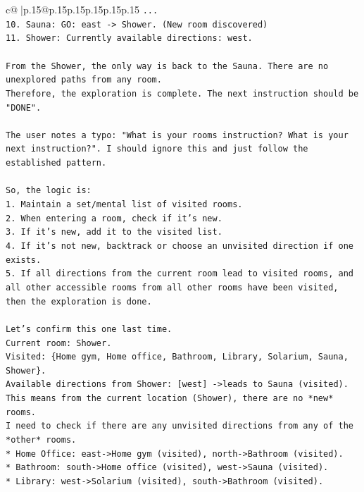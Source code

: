 \documentclass{article}
\begin{document}
{\begin{supertabular}{c@{$\;$}|p{.15\linewidth}@{}p{.15\linewidth}p{.15\linewidth}p{.15\linewidth}p{.15\linewidth}p{.15\linewidth}}
{{{\texttt{...} \\
\texttt{10. Sauna: GO: east {-}> Shower. (New room discovered)} \\
\texttt{11. Shower: Currently available directions: west.} \\
\\ 
\texttt{From the Shower, the only way is back to the Sauna. There are no unexplored paths from any room.} \\
\texttt{Therefore, the exploration is complete. The next instruction should be "DONE".} \\
\\ 
\texttt{The user notes a typo: "What is your rooms instruction? What is your next instruction?". I should ignore this and just follow the established pattern.} \\
\\ 
\texttt{So, the logic is:} \\
\texttt{1. Maintain a set/mental list of visited rooms.} \\
\texttt{2. When entering a room, check if it's new.} \\
\texttt{3. If it's new, add it to the visited list.} \\
\texttt{4. If it's not new, backtrack or choose an unvisited direction if one exists.} \\
\texttt{5. If all directions from the current room lead to visited rooms, and all other accessible rooms from all other rooms have been visited, then the exploration is done.} \\
\\ 
\texttt{Let's confirm this one last time.} \\
\texttt{Current room: Shower.} \\
\texttt{Visited: \{Home gym, Home office, Bathroom, Library, Solarium, Sauna, Shower\}.} \\
\texttt{Available directions from Shower: {[}west{]} {-}>leads to Sauna (visited).} \\
\texttt{This means from the current location (Shower), there are no *new* rooms.} \\
\texttt{I need to check if there are any unvisited directions from any of the *other* rooms.} \\
\texttt{*   Home Office: east{-}>Home gym (visited), north{-}>Bathroom (visited).} \\
\texttt{*   Bathroom: south{-}>Home office (visited), west{-}>Sauna (visited).} \\
\texttt{*   Library: west{-}>Solarium (visited), south{-}>Bathroom (visited).} \\
}}}
\end{supertabular}}
\end{document}
